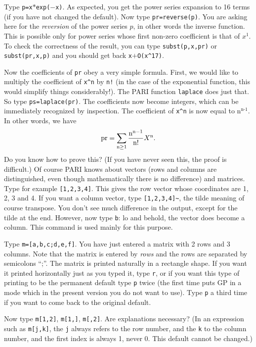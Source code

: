Type {\tt p=x$*$exp($-$x)}. As expected, you get the power series expansion
to 16 terms (if you have not changed the default). Now type
{\tt pr=reverse(p)}. You are asking here for the {\sl reversion\/} of the
power series $p$, in other words the inverse function. This is possible only
for power series whose first non-zero coefficient is that of $x^1$.
To check the correctness of the result, you can type {\tt subst(p,x,pr)}
or {\tt subst(pr,x,p)} and you should get back {\tt x$+$O(x\^{}17)}.

Now the coefficients of {\tt pr} obey a very simple formula. First, we would
like to multiply the coefficient of {\tt x\^{}n} by {\tt n!} (in the case of the
exponential function, this would simplify things considerably!). The PARI
function {\tt laplace} does just that. So type {\tt ps=laplace(pr)}. The
coefficients now become integers, which can be immediately recognized by
inspection. The coefficient of {\tt x\^{}n} is now equal to $\text{n}^{\text{n-1}}$. In other words, we have 
\def\n{{\rm n}}
$$\text{pr}=\sum_{\n\ge1}\dfrac{\n^{\n-1}}{\n!}X^{\n}.$$Do you know how to
prove this? (If you have never seen this, the proof is difficult.)
\smallskip
Of course PARI knows about vectors (rows and columns are distinguished, even
though mathematically there is no difference) and matrices. Type for example
{\tt [1,2,3,4]}. This gives the row vector whose coordinates are 1, 2, 3 and 4.
If you want a column vector, type {\tt [1,2,3,4]\~{}}, the tilde meaning of
course transpose. You don't see much difference in the output, except for the
tilde at the end. However, now type {\tt \bs b}: lo and behold, the vector
does become a column. This command is used mainly for this purpose.

Type {\tt m=[a,b,c;d,e,f]}. You have just entered a matrix with 2 rows and 3
columns. Note that the matrix is entered by {\sl rows\/} and the rows are
separated by semicolons ``;''. The matrix is printed naturally in a rectangle
shape. If you want it printed horizontally just as you typed it, type
{\tt \bs r}, or if you want this type of printing to be the permanent default
type {\tt \bs p} twice (the first time puts GP in a mode which in the present
version you do not want to use). Type {\tt \bs p} a third time if you want
to come back to the original default.

Now type {\tt m[1,2]}, {\tt m[1,]}, {\tt m[,2]}. Are explanations necessary?
(In an expression such as {\tt m[j,k]}, the {\tt j} always refers to the
row number, and the {\tt k} to the column number, and the first index is
always 1, never 0. This default cannot be changed.)

